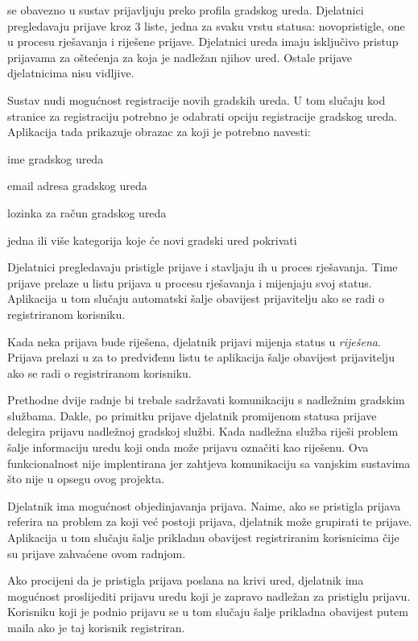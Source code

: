 		 se obavezno u sustav prijavljuju preko profila gradskog ureda. Djelatnici pregledavaju prijave kroz 3 liste, jedna za svaku vrstu statusa: novopristigle, one u procesu rješavanja i riješene prijave. Djelatnici ureda imaju isključivo pristup prijavama za oštećenja za koja je nadležan njihov ured. Ostale prijave djelatnicima nisu vidljive.
		
		Sustav nudi mogućnost registracije novih gradskih ureda. U tom slučaju kod stranice za registraciju potrebno je odabrati opciju registracije gradskog ureda. Aplikacija tada prikazuje obrazac za koji je potrebno navesti:
		\begin{packed_item} 
			\item ime gradskog ureda
			\item email adresa gradskog ureda
			\item lozinka za račun gradskog ureda
			\item jedna ili više kategorija koje će novi gradski ured pokrivati
		\end{packed_item}
		
		Djelatnici pregledavaju pristigle prijave i stavljaju ih u proces rješavanja. Time prijave prelaze u listu prijava u procesu rješavanja i mijenjaju svoj status. Aplikacija u tom slučaju automatski šalje obavijest prijavitelju ako se radi o registriranom korisniku.
		
		Kada neka prijava bude riješena, djelatnik prijavi mijenja status u \textit{riješena}. Prijava prelazi u za to predviđenu listu te aplikacija šalje obavijest prijavitelju ako se radi o registriranom korisniku.
		
		Prethodne dvije radnje bi trebale sadržavati komunikaciju s nadležnim gradskim službama. Dakle, po primitku prijave djelatnik promijenom statusa prijave delegira prijavu nadležnoj gradskoj službi. Kada nadležna služba riješi problem šalje informaciju uredu koji onda može prijavu označiti kao riješenu. Ova funkcionalnost nije implentirana jer zahtjeva komunikaciju sa vanjskim sustavima što nije u opsegu ovog projekta.
		
		Djelatnik ima mogućnost objedinjavanja prijava. Naime, ako se pristigla prijava referira na problem za koji već postoji prijava, djelatnik može grupirati te prijave. Aplikacija u tom slučaju šalje prikladnu obavijest registriranim korisnicima čije su prijave zahvaćene ovom radnjom.
		
		Ako procijeni da je pristigla prijava poslana na krivi ured, djelatnik ima mogućnost proslijediti prijavu uredu koji je zapravo nadležan za pristiglu prijavu. Korisniku koji je podnio prijavu se u tom slučaju šalje prikladna obavijest putem maila ako je taj korisnik registriran.
		
